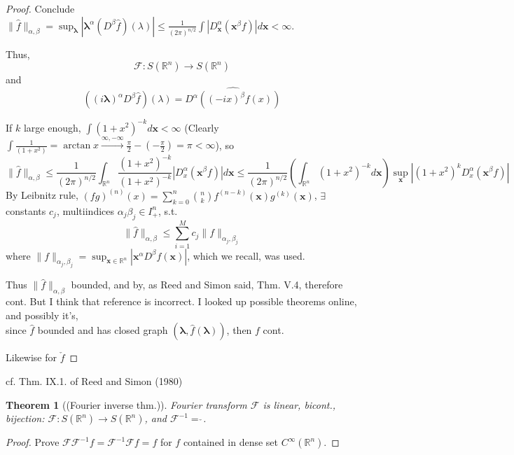 \documentclass[10pt]{amsart}
\newtheorem{theorem}{Theorem}
\begin{document}
\begin{multicols*}{2}
\begin{proof}
Conclude $\| \widehat{f} \|_{\alpha, \beta} = \sup_{\mathbf{\lambda} } | \mathbf{\lambda}^{\alpha} (D^{\beta} \widehat{f})(\lambda) | \leq \frac{1}{ (2\pi)^{n/2}} \int | D_{\mathbf{x}}^{\alpha}(\mathbf{x}^{\beta} f) | d\mathbf{x} < \infty$.  

Thus, 
\[
\mathcal{F}: S(\mathbb{R}^n) \to S(\mathbb{R}^n) 
\]
and 
\[
((i\mathbf{\lambda})^{\alpha} D^{\beta}\widehat{f})(\lambda)  = \widehat{ D^{\alpha}((-ix)^{\beta}f(x)) }
\]

If $k$ large enough, $\int  (1+x^2)^{-k} d\mathbf{x} < \infty$ (Clearly $\int \frac{1}{(1+x^2)}= \arctan{x} \xrightarrow{ \infty, -\infty} \frac{\pi}{2} - (-\frac{\pi}{2}) = \pi < \infty$), so 
\[
\| \widehat{f} \|_{\alpha, \beta} \leq \frac{1}{(2\pi)^{n/2}} \int_{\mathbb{R}^n} \frac{ (1+x^2)^{-k} }{ (1+x^2 )^{-k} } |D_x^{\alpha} (\mathbf{x}^{\beta} f) | d\mathbf{x} \leq \frac{1}{(2\pi)^{n/2}} (\int_{\mathbb{R}^n } (1+x^2)^{-k} d\mathbf{x}) \sup_{\mathbf{x}} |(1+x^2)^k D_x^{\alpha} (\mathbf{x}^{\beta} f)|
\]
By Leibnitz rule, $(fg)^{(n)}(x) = \sum_{k=0}^n \binom{n}{k} f^{(n-k)}(\mathbf{x}) g^{(k)}(\mathbf{x}) $, $\exists \, $ constants $c_j$, multiindices $\alpha_j \beta_j \in I_+^n$, s.t. 
\[
\| \widehat{f} \|_{\alpha, \beta} \leq \sum_{i=1}^M c_j \| f\|_{\alpha_j,\beta_j} 
\]
where $\| f\|_{\alpha_j , \beta_j} = \sup_{\mathbf{x} \in \mathbb{R}^n } | \mathbf{x}^{\alpha} D^{\beta} f(\mathbf{x}) |$, which we recall, was used.  

Thus $\| \widehat{f} \|_{\alpha,\beta}$ bounded, and by, as Reed and Simon \cite{ReSi1980} said, Thm. V.4, therefore cont.  But I think that reference is incorrect.  I looked up possible theorems online, and possibly it's, \\
since $\widehat{f}$ bounded and has closed graph $(\mathbf{\lambda}, \widehat{f}(\mathbf{\lambda}))$, then $f$ cont.  

Likewise for $\check{f}$

	\end{proof}

cf. Thm. IX.1. of Reed and Simon (1980)\cite{ReSi1980}
\begin{theorem}[(Fourier inverse thm.)]
	Fourier transform $\mathcal{F}$ is linear, bicont., bijection: $\mathcal{F} : S(\mathbb{R}^n ) \to S(\mathbb{R}^n) $, and $\mathcal{F}^{-1} = \check{\, }$.  
\end{theorem}
\begin{proof}
Prove $\mathcal{F} \mathcal{F}^{-1} f = \mathcal{F}^{-1} \mathcal{F} f = f$ for $f$ contained in dense set $C^{\infty}(\mathbb{R}^n)$.  


\end{proof}
\end{multicols*}
\end{document}
